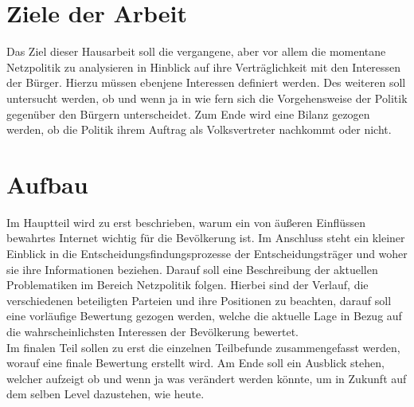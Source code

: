 \documentclass[
	12pt,
	a4paper,
	BCOR10mm,
	DIV14,
	listof=totoc,
	bibliography=totoc,
	headsepline
]{scrreprt}
\begin{document}
\section{Ziele der Arbeit}
\label{aims}
Das Ziel dieser Hausarbeit soll die vergangene, aber vor allem die momentane Netzpolitik zu analysieren in Hinblick auf ihre Verträglichkeit mit den Interessen der Bürger.
Hierzu müssen ebenjene Interessen definiert werden.
Des weiteren soll untersucht werden, ob und wenn ja in wie fern sich die Vorgehensweise der Politik gegenüber den Bürgern unterscheidet.
Zum Ende wird eine Bilanz gezogen werden, ob die Politik ihrem Auftrag als Volksvertreter nachkommt oder nicht.



\section{Aufbau}
\label{structure}
Im Hauptteil wird zu erst beschrieben, warum ein von äußeren Einflüssen bewahrtes Internet wichtig für die Bevölkerung ist.
Im Anschluss steht ein kleiner Einblick in die Entscheidungsfindungsprozesse der Entscheidungsträger und woher sie ihre Informationen beziehen.
Darauf soll eine Beschreibung der aktuellen Problematiken im Bereich Netzpolitik folgen.
Hierbei sind der Verlauf, die verschiedenen beteiligten Parteien und ihre Positionen zu beachten, darauf soll eine vorläufige Bewertung gezogen werden, welche die aktuelle Lage in Bezug auf die wahrscheinlichsten Interessen der Bevölkerung bewertet. \\
Im finalen Teil sollen zu erst die einzelnen Teilbefunde zusammengefasst werden, worauf eine finale Bewertung erstellt wird.
Am Ende soll ein Ausblick stehen, welcher aufzeigt ob und wenn ja was verändert werden könnte, um in Zukunft auf dem selben Level dazustehen, wie heute.
\end{document}
